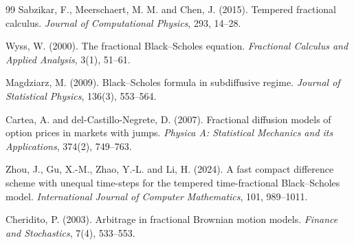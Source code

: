\documentclass[11pt,a4paper]{report}
\begin{document}
\begin{thebibliography}{99}
Sabzikar, F., Meerschaert, M. M. and Chen, J. (2015).
Tempered fractional calculus.
\textit{Journal of Computational Physics}, 293, 14--28.

Wyss, W. (2000).
The fractional Black--Scholes equation.
\textit{Fractional Calculus and Applied Analysis}, 3(1), 51--61.

Magdziarz, M. (2009).
Black--Scholes formula in subdiffusive regime.
\textit{Journal of Statistical Physics}, 136(3), 553--564.

Cartea, A. and del-Castillo-Negrete, D. (2007).
Fractional diffusion models of option prices in markets with jumps.
\textit{Physica A: Statistical Mechanics and its Applications}, 374(2), 749--763.

Zhou, J., Gu, X.-M., Zhao, Y.-L. and Li, H. (2024).
A fast compact difference scheme with unequal time-steps for the tempered time-fractional Black--Scholes model.
\textit{International Journal of Computer Mathematics}, 101, 989--1011.

Cheridito, P. (2003).
Arbitrage in fractional Brownian motion models.
\textit{Finance and Stochastics}, 7(4), 533--553.

\end{thebibliography}
\end{document}
